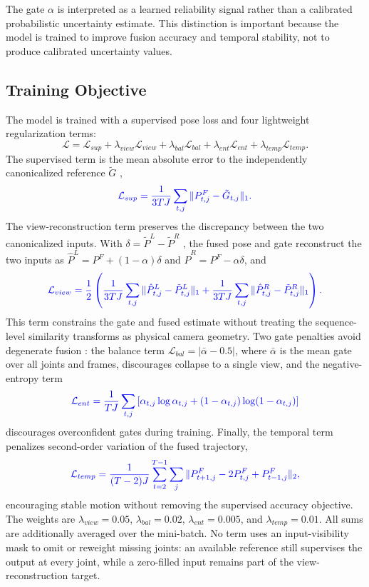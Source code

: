 \documentclass[preprint,12pt]{elsarticle}
\providecommand{\DIFaddbegin}{} %
\providecommand{\DIFaddend}{} %
\providecommand{\DIFadd}[1]{{\protect\color{blue}#1}} %
\begin{document}
The gate \(\alpha\) is interpreted as a learned reliability signal rather than a calibrated probabilistic uncertainty estimate. This distinction is important because the model is trained to improve fusion accuracy and temporal stability, not to produce calibrated uncertainty values.

\subsection{Training Objective}
\label{subsec:training_objective}

The model is trained with a supervised pose loss and \DIFaddbegin \DIFadd{four }\DIFaddend lightweight regularization terms:
\[
\mathcal{L}
=
\mathcal{L}_{sup}
+
\lambda_{view}\mathcal{L}_{view}
+
\lambda_{bal}\mathcal{L}_{bal}
+
\lambda_{ent}\mathcal{L}_{ent}
+
\lambda_{temp}\mathcal{L}_{temp}.
\]
The supervised term is  \DIFaddbegin \DIFadd{the mean absolute error to the independently canonicalized reference }\DIFaddend \(\tilde{G}\) \DIFaddbegin \DIFadd{,
}\[
\DIFadd{\mathcal{L}_{sup}=\frac{1}{3TJ}\sum_{t,j}\|P^{F}_{t,j}-\tilde{G}_{t,j}\|_{1}.
}\]
\DIFadd{The view-reconstruction }\DIFaddend term preserves the discrepancy between the two  canonicalized inputs.  \DIFaddbegin \DIFadd{With }\DIFaddend \(\delta=\tilde{P}^{L}-\tilde{P}^{R}\) \DIFaddbegin \DIFadd{, the fused pose and gate reconstruct the two inputs as }\DIFaddend \(\hat{P}^{L}=P^{F}+(1-\alpha)\delta\) and \(\hat{P}^{R}=P^{F}-\alpha\delta\), and
 \DIFaddbegin \[
\DIFadd{\mathcal{L}_{view}=\frac{1}{2}\left(\frac{1}{3TJ}\sum_{t,j}\|\hat{P}^{L}_{t,j}-\tilde{P}^{L}_{t,j}\|_{1}
+\frac{1}{3TJ}\sum_{t,j}\|\hat{P}^{R}_{t,j}-\tilde{P}^{R}_{t,j}\|_{1}\right).
}\]
\DIFaddend This term constrains the gate and fused estimate without treating the sequence-level similarity transforms as physical camera geometry.  \DIFaddbegin \DIFadd{Two gate penalties }\DIFaddend avoid degenerate fusion \DIFaddbegin \DIFadd{: the balance term \(\mathcal{L}_{bal}=|\bar{\alpha}-0.5|\), where \(\bar{\alpha}\) is the mean gate over all joints and frames, }\DIFaddend discourages collapse to a single view,  \DIFaddbegin \DIFadd{and the negative-entropy term
}\[
\DIFadd{\mathcal{L}_{ent}=\frac{1}{TJ}\sum_{t,j}\left[\alpha_{t,j}\log\alpha_{t,j}+(1-\alpha_{t,j})\log(1-\alpha_{t,j})\right]
}\]
\DIFaddend discourages overconfident gates during training. Finally,  \DIFaddbegin \DIFadd{the temporal term penalizes }\DIFaddend second-order  \DIFaddbegin \DIFadd{variation of the fused trajectory,
}\[
\DIFadd{\mathcal{L}_{temp}=\frac{1}{(T-2)J}\sum_{t=2}^{T-1}\sum_{j}\|P^{F}_{t+1,j}-2P^{F}_{t,j}+P^{F}_{t-1,j}\|_{2},
}\]
\DIFaddend encouraging stable motion  without removing the supervised accuracy objective.  \DIFaddbegin \DIFadd{The weights are \(\lambda_{view}=0.05\), \(\lambda_{bal}=0.02\), \(\lambda_{ent}=0.005\), and \(\lambda_{temp}=0.01\). All sums are additionally averaged over the mini-batch}\DIFaddend . No term uses an input-visibility mask to omit or reweight missing joints: an available reference still supervises the output at every joint, while a zero-filled input remains part of the view-reconstruction target.
\end{document}
